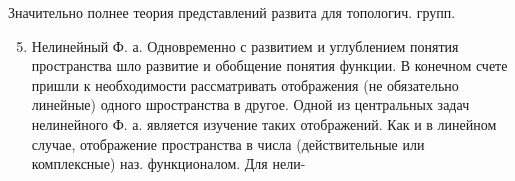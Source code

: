 \documentclass[10pt]{article}
\begin{document}
Значительно полнее теория представлений развита для топологич. групп.



\begin{enumerate}

  \setcounter{enumi}{4}

  \item Нелинейный Ф. а. Одновременно с развитием и углублением понятия пространства шло развитие и обобщение понятия функции. В конечном счете пришли к необходимости рассматривать отображения (не обязательно линейные) одного шространства в другое. Одной из центральных задач нелинейного Ф. а. является изучение таких отображений. Как и в линейном случае, отображение пространства в числа (действительные или комплексные) наз. функционалом. Для нели-

\end{enumerate}
\end{document}

